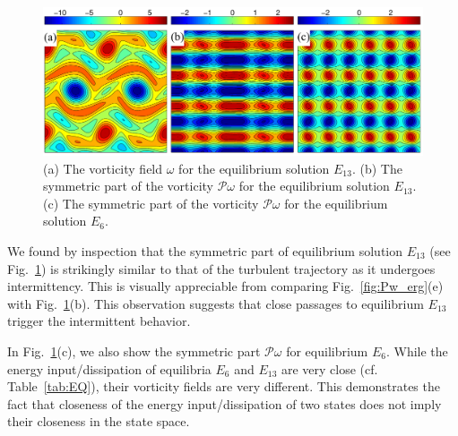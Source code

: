 \documentclass{jfm}
\begin{document}
\begin{figure}
\centering
\includegraphics[width=\textwidth]{E13}
\caption{
(a) The vorticity field $\omega$ for the equilibrium solution $E_{13}$.
(b) The symmetric part of the vorticity $\mathcal P\omega$ for the equilibrium solution $E_{13}$.
(c) The symmetric part of the vorticity $\mathcal P\omega$ for the equilibrium solution $E_{6}$.
}
\label{fig:E13}
\end{figure}

We found by inspection that the symmetric part of equilibrium solution $E_{13}$ (see Fig.~\ref{fig:E13})
is strikingly similar to that of the turbulent trajectory as it undergoes intermittency.
This is visually appreciable from comparing Fig.~\ref{fig:Pw_erg}(e) with Fig.~\ref{fig:E13}(b).
This observation suggests that close passages to equilibrium $E_{13}$ trigger the intermittent
behavior.

In Fig.~\ref{fig:E13}(c), we also show the symmetric part $\mathcal P\omega$ for
equilibrium $E_6$. While the energy input/dissipation of equilibria
$E_6$ and $E_{13}$ are very close (cf. Table~\ref{tab:EQ}), their vorticity fields are very
different. This demonstrates the fact that closeness of the energy input/dissipation of two states
does not imply their closeness in the state space.
\end{document}
